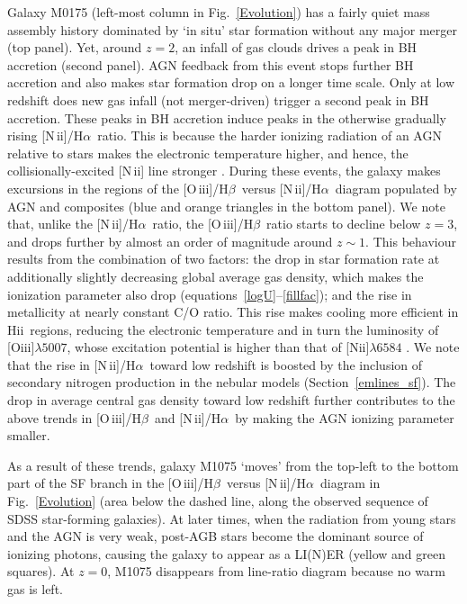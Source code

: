 \documentclass[fleqn,usenatbib]{mnras}
\newcommand{\hii}{\hbox{H{\sc ii}}}
\newcommand{\oiiihb}{\hbox{[O\,{\sc iii}]/H$\beta$}}
\newcommand{\niiha}{\hbox{[N\,{\sc ii}]/H$\alpha$}}
\begin{document}
Galaxy M0175 (left-most column in Fig.~\ref{Evolution}) has a fairly  
quiet mass assembly history dominated by `in situ' star formation
without any major merger (top panel). Yet, around $z=2$, an infall of
gas clouds drives a peak in BH accretion (second panel). AGN feedback
from this event stops further BH accretion and also makes star
formation drop on a longer time scale. Only at low redshift does new
gas infall (not merger-driven) trigger a second peak in BH
accretion. These peaks in BH accretion induce peaks in the otherwise
gradually rising \niiha\ ratio. This is because the harder ionizing
radiation of an AGN relative to stars makes the electronic temperature
higher, and hence, the collisionally-excited [N\,{\sc ii}] line
stronger  \citep[see figure~1 of ][]{Feltre16}. During these events,
the galaxy makes excursions in the regions of the \oiiihb\ versus
\niiha\ diagram populated by  AGN and composites (blue and orange
triangles in the bottom panel). We note that, unlike the \niiha\
ratio, the \oiiihb\ ratio starts to decline below $z=3$, and drops
further by almost an order of magnitude around $z \sim 1$. This
behaviour results from  the combination of two factors: the drop in
star formation rate at additionally slightly  decreasing global
average gas density, which makes the ionization parameter also  drop
(equations~\ref{logU}--\ref{fillfac}); and the rise in metallicity at
nearly constant C/O ratio. This rise makes cooling more efficient in
\hii\ regions, reducing the electronic temperature and in turn the
luminosity of [O{\sc iii}]$\lambda5007$, whose  excitation potential
is higher than that of [N{\sc ii}]$\lambda6584$
\citep{Stasinska80,Gutkin16}.  We note that the rise in \niiha\ toward
low redshift is boosted by the inclusion of secondary nitrogen
production in the nebular models (Section~\ref{emlines_sf}). The drop
in average central gas density toward low redshift further contributes
to the  above trends in \oiiihb\ and \niiha\ by making the AGN
ionizing parameter smaller.  

As a result of these trends, galaxy M1075 `moves' from the top-left to
the bottom part  of the SF branch in the \oiiihb\ versus \niiha\
diagram in Fig.~\ref{Evolution} (area below  the dashed line, along
the observed sequence of SDSS star-forming galaxies). At later  times,
when the radiation from young stars and the AGN is very weak, post-AGB
stars become the dominant source of ionizing photons, causing the
galaxy to appear as a LI(N)ER (yellow and green squares). At $z=0$,
M1075 disappears from  line-ratio diagram because no warm gas is left.
\end{document}
